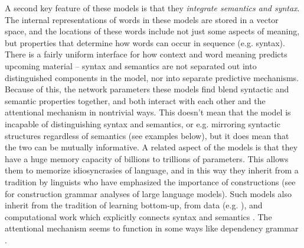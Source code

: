 \documentclass[output=paper,colorlinks,citecolor=brown]{langscibook}
\begin{document}
A second key feature of these models is that they \textit{integrate semantics and syntax}. The internal representations of words in these models are stored in a vector space, and the locations of these words include not just some aspects of meaning, but properties that determine how words can occur in sequence (e.g. syntax). There is a fairly uniform interface for how context and word meaning predicts upcoming material -- syntax and semantics are not separated out into distinguished components in the model, nor into separate predictive mechanisms. Because of this, the network parameters these models find blend syntactic and semantic properties together, and both interact with each other and the attentional mechanism in nontrivial ways. This doesn't mean that the model is incapable of distinguishing syntax and semantics, or e.g. mirroring syntactic structures regardless of semantics (see examples below), but it does mean that the two can be mutually informative. A related aspect of the models is that they have a huge memory capacity of billions to trillions of parameters. This allows them to memorize idiosyncrasies of language, and in this way they inherit from a tradition by linguists who have emphasized the importance of constructions \citep{adele1995constructions,jackendoff2013constructions,goldberg2006constructions,goldberg2003constructions,tomasello2000item,mccauley2019language,tomasello2005constructing,edelman2007behavioral} (see \citealt{weissweiler2023construction} for construction grammar analyses of large language models). Such models also inherit from the tradition of learning bottom-up, from data (e.g. \citealt{bod2003data,solan2005unsupervised}), and computational work which explicitly connects syntax and semantics \citep{steedman2001syntactic,siskind1996computational,ge2005statistical,kwiatkowski2012probabilistic,liang2009learning}. The attentional mechanism seems to function in some ways like dependency grammar \citep{
tesniere1959elements,hays1964dependency,de2021universal}.
\end{document}
